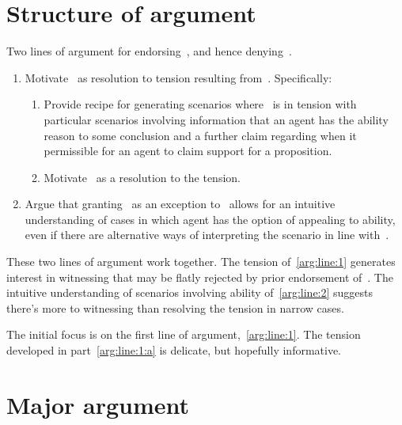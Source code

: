 \section{Structure of argument}
\label{sec:structure-argument}

\begin{note}
  Two lines of argument for endorsing~\EAS{}, and hence denying~\ESU{}.
  \begin{enumerate}[label=(L\arabic*), ref=(L\arabic*)]
  \item\label{arg:line:1} Motivate~\EAS{} as resolution to tension resulting from~\ESU{}.\newline
    Specifically:
    \begin{enumerate}[label=(L1\alph*)]
    \item\label{arg:line:1:a} Provide recipe for generating scenarios where~\ESU{} is in tension with particular scenarios involving information that an agent has the ability reason to some conclusion and a further claim regarding when it permissible for an agent to claim support for a proposition.
    \item\label{arg:line:1:b} Motivate~\EAS{} as a resolution to the tension.
    \end{enumerate}
  \item\label{arg:line:2} Argue that granting~\EAS{} as an exception to~\ESU{} allows for an intuitive understanding of cases in which agent has the option of appealing to ability, even if there are alternative ways of interpreting the scenario in line with~\ESU{}.
  \end{enumerate}
  These two lines of argument work together.
  The tension of~\ref{arg:line:1} generates interest in witnessing that may be flatly rejected by prior endorsement of~\ESU{}.
  The intuitive understanding of scenarios involving ability of~\ref{arg:line:2} suggests there's more to witnessing than resolving the tension in narrow cases.
\end{note}

\begin{note}
  The initial focus is on the first line of argument,~\ref{arg:line:1}.
  The tension developed in part~\ref{arg:line:1:a} is delicate, but hopefully informative.
\end{note}

\section{Major argument}
\label{sec:major-argument}

